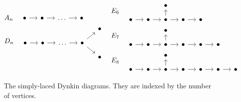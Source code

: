 \begin{figure}[ht]
	\centering
	\begin{align*}
		 &
		\begin{aligned}
			 & A_n \quad \begin{tikzcd}[ampersand replacement=\&, sep=small]
				             \bullet \rar \& \bullet \rar \&\dots \rar \&\bullet
			             \end{tikzcd}               \\
			 & D_n \quad \begin{tikzcd}[ampersand replacement=\&, sep=small]
				             \&\&\&\&\bullet \\
				             \bullet \rar \& \bullet \rar \&\dots \rar \& \bullet \drar \urar \\
				             \&\&\&\&\bullet
			             \end{tikzcd}
		\end{aligned}
		 &   &
		\begin{aligned}
			 & E_6 \quad \begin{tikzcd}[ampersand replacement=\&, sep=small]
				             \&\&\bullet\\
				             \bullet \rar \& \bullet \rar \&\bullet \rar\uar \& \bullet \rar \& \bullet
			             \end{tikzcd}                                 \\
			 & E_7 \quad \begin{tikzcd}[ampersand replacement=\&, sep=small]
				             \&\&\bullet\\
				             \bullet \rar \& \bullet \rar \&\bullet \rar\uar \& \bullet \rar \& \bullet \rar \& \bullet
			             \end{tikzcd}                 \\
			 & E_8 \quad \begin{tikzcd}[ampersand replacement=\&, sep=small]
				             \&\&\bullet\\
				             \bullet \rar \& \bullet \rar \&\bullet \rar\uar \& \bullet \rar \& \bullet \rar \& \bullet\rar \& \bullet
			             \end{tikzcd}
		\end{aligned}
	\end{align*}

	\caption{The simply-laced Dynkin diagrams. They are indexed by the number of vertices.}
	\label{fig:dynkin_diagrams_ade}
\end{figure}

